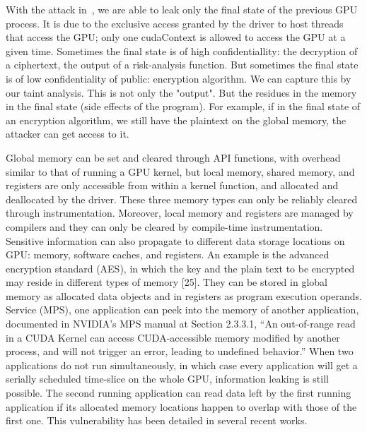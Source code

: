 % 
With the attack in~\cite{}, we are able to leak only the final state of the previous GPU process. 
%
It is due to the exclusive access granted by the driver to host threads that access the GPU; only one cudaContext is
allowed to access the GPU at a given time.
%
Sometimes the final state is of high confidentiallity: the decryption of a
ciphertext, the output of a risk-analysis function.
%
But sometimes the final state is of low confidentiality of public:
encryption algorithm.
%
We can capture this by our taint analysis.
%
This is not only the "output". 
%
But the residues in the memory in the final state (side effects of the program).
%
For example, if in the final state of an encryption algorithm, we still have the plaintext on the global memory, the attacker can get access to it.







Global memory can be set and cleared through API
functions, with overhead similar to that of running a GPU
kernel, but local memory, shared memory, and registers
are only accessible from within a kernel function, and allocated and deallocated by the driver. These three memory types can only be reliably cleared through instrumentation. Moreover, local memory and registers are
managed by compilers and they can only be cleared by
compile-time instrumentation.
Sensitive information can also propagate to different data storage locations on GPU: memory, software
caches, and registers. An example is the advanced encryption standard (AES), in which the key and the plain
text to be encrypted may reside in different types of
memory [25]. They can be stored in global memory as
allocated data objects and in registers as program execution operands.
Service (MPS), one application can peek into the memory of another application, documented in NVIDIA's
MPS manual at Section 2.3.3.1, “An out-of-range read
in a CUDA Kernel can access CUDA-accessible memory modified by another process, and will not trigger
an error, leading to undefined behavior.” When two applications do not run simultaneously, in which case every application will get a serially scheduled time-slice
on the whole GPU, information leaking is still possible. The second running application can read data left
by the first running application if its allocated memory
locations happen to overlap with those of the first one.
This vulnerability has been detailed in several recent
works. 




